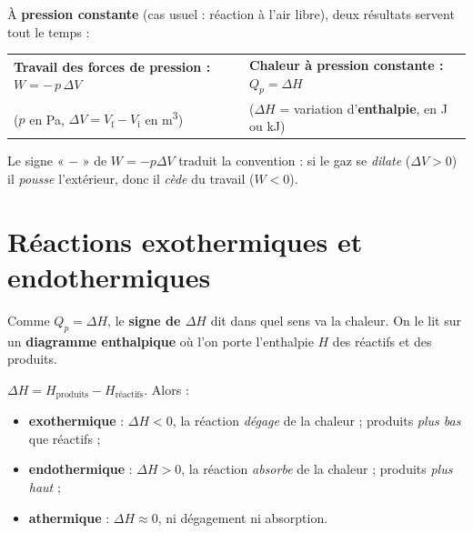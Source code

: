 \documentclass[11pt,a4paper]{article}
\newcommand{\dH}{\Delta H}
\begin{document}
À \textbf{pression constante} (cas usuel : réaction à l'air libre), deux résultats servent tout le temps :
\begin{center}
\begin{tabular}{@{}p{7.3cm}p{8.3cm}@{}}
\textbf{Travail des forces de pression :} \quad $W = -\,p\,\Delta V$ &
\textbf{Chaleur à pression constante :} \quad $Q_p = \dH$ \\
($p$ en \si{\pascal}, $\Delta V=V_{\text{f}}-V_{\text{i}}$ en \si{\cubic\metre}) &
($\dH$ = variation d'\textbf{enthalpie}, en \si{\joule} ou \si{\kilo\joule}) \\
\end{tabular}
\end{center}
Le signe « $-$ » de $W=-p\Delta V$ traduit la convention : si le gaz se \emph{dilate} ($\Delta V>0$) il
\emph{pousse} l'extérieur, donc il \emph{cède} du travail ($W<0$).

\section{Réactions exothermiques et endothermiques}

Comme $Q_p=\dH$, le \textbf{signe de $\dH$} dit dans quel sens va la chaleur. On le lit sur un
\textbf{diagramme enthalpique} où l'on porte l'enthalpie $H$ des réactifs et des produits.

\begin{definitionb}
$\dH = H_{\text{produits}} - H_{\text{réactifs}}$. Alors :
\begin{itemize}[leftmargin=1.5em,topsep=1pt,itemsep=1pt]
  \item \textbf{exothermique} : $\dH<0$, la réaction \emph{dégage} de la chaleur ; produits \emph{plus bas} que réactifs ;
  \item \textbf{endothermique} : $\dH>0$, la réaction \emph{absorbe} de la chaleur ; produits \emph{plus haut} ;
  \item \textbf{athermique} : $\dH\approx 0$, ni dégagement ni absorption.
\end{itemize}
\end{definitionb}
\end{document}
